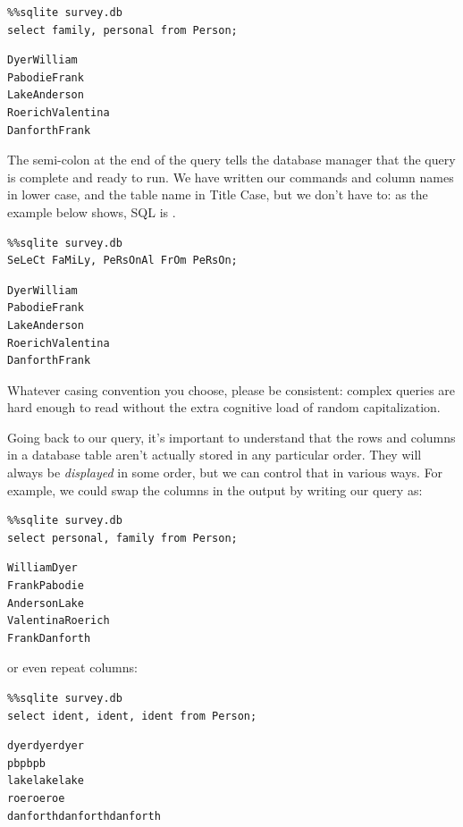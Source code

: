 \documentclass{book}
\begin{document}
\begin{verbatim}
%%sqlite survey.db
select family, personal from Person;
\end{verbatim}

\begin{verbatim}
DyerWilliam
PabodieFrank
LakeAnderson
RoerichValentina
DanforthFrank
\end{verbatim}

The semi-colon at the end of the query tells the database manager that
the query is complete and ready to run. We have written our commands and
column names in lower case, and the table name in Title Case, but we
don't have to: as the example below shows, SQL is
.

\begin{verbatim}
%%sqlite survey.db
SeLeCt FaMiLy, PeRsOnAl FrOm PeRsOn;
\end{verbatim}

\begin{verbatim}
DyerWilliam
PabodieFrank
LakeAnderson
RoerichValentina
DanforthFrank
\end{verbatim}

Whatever casing convention you choose, please be consistent: complex
queries are hard enough to read without the extra cognitive load of
random capitalization.

Going back to our query, it's important to understand that the rows and
columns in a database table aren't actually stored in any particular
order. They will always be \emph{displayed} in some order, but we can
control that in various ways. For example, we could swap the columns in
the output by writing our query as:

\begin{verbatim}
%%sqlite survey.db
select personal, family from Person;
\end{verbatim}

\begin{verbatim}
WilliamDyer
FrankPabodie
AndersonLake
ValentinaRoerich
FrankDanforth
\end{verbatim}

or even repeat columns:

\begin{verbatim}
%%sqlite survey.db
select ident, ident, ident from Person;
\end{verbatim}

\begin{verbatim}
dyerdyerdyer
pbpbpb
lakelakelake
roeroeroe
danforthdanforthdanforth
\end{verbatim}
\end{document}
